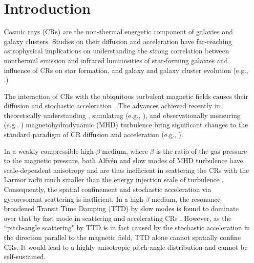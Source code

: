 \documentclass[preprint2,twocolumn,times,tighten]{aastex63}
\begin{document}
\section{Introduction} 

Cosmic rays (CRs) are the non-thermal energetic component of galaxies and galaxy clusters.
Studies on their diffusion and acceleration have far-reaching astrophysical implications on understanding the strong correlation between nonthermal emission and infrared luminosities of star-forming galaxies 
\citep{Yun01,Ajel20}
and influence of CRs on star formation, and galaxy and galaxy cluster evolution
(e.g., \citealt{Blas00,Pfro08,Hop12,Evoli12,La16,BruL16,Wien17,Hol18,Krum20,Seme21,Quat22,Liu23}.)




The interaction of CRs with the ubiquitous turbulent magnetic fields causes their diffusion and stochastic acceleration
\citep{Schlickeiser02,Mar20,Liu21}.
The advances achieved recently in theoretically understanding
\citep{GS95,LV99}
, simulating
(e.g., \citealt{MG01,CL02_PRL,Bere14}), 
and observationally measuring  
(e.g., \citealt{Laz18,Humc19,Huse22,Yuen22})
magnetohydrodynamic (MHD) turbulence 
bring significant changes to the standard paradigm of CR diffusion and acceleration
(e.g., \citealt{Chan00,YL04,XY13,LY14,XLb18,LucS18,Siou20,Hucr22,Kemp22,Bea22,LXm21,Forn21,Zhda21,Natt21,Lemo22,Samp23,Lemo23,Kemp23}).


In a weakly compressible high-$\beta$ medium, where $\beta$ is the ratio of the gas pressure to the magnetic pressure, both Alfv\'{e}n and slow modes of MHD turbulence have scale-dependent anisotropy 
\citep{CV00,CL02_PRL}
and are thus inefficient in scattering the CRs with the Larmor radii much smaller than the energy injection scale of turbulence 
\citep{Chan00,YL02,BYL2011,XL20}. 
Consequently, the spatial confinement and 
stochastic acceleration via gyroresonant scattering is inefficient. 
In a high-$\beta$ medium, 
the resonance-broadened Transit Time Damping
(TTD) by slow modes is found to dominate over that by fast mode in scattering and accelerating CRs 
\citep{XLb18}. 
However, as the ``pitch-angle scattering" by TTD is in fact caused by the stochastic acceleration in the direction parallel to the magnetic field, TTD alone cannot spatially confine CRs. 
It would lead to a highly anisotropic pitch angle distribution and cannot be self-sustained. 
\end{document}
